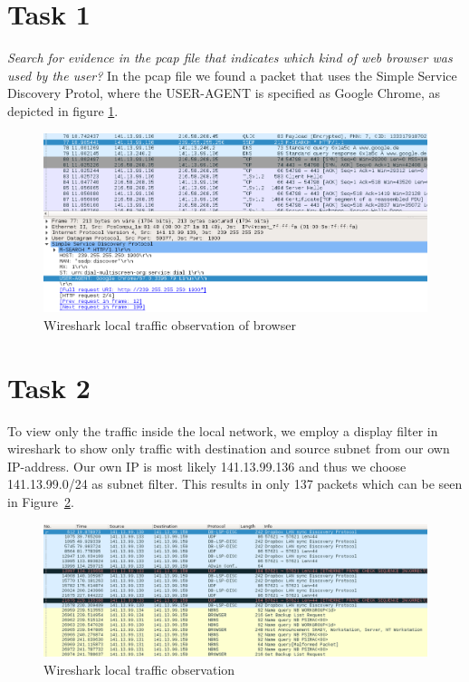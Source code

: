 \documentclass[12pt]{article}
\begin{document}
\maketitle


\section{Task 1}\label{task1}
\emph{Search for evidence in the pcap file that indicates which kind of web browser was
used by the user?}
In the pcap file we found a packet that uses the Simple Service Discovery Protol, where the USER-AGENT is specified as Google Chrome, as depicted in figure \ref{wireshark_browser}.
\begin{figure}[h]%
\centering%
\includegraphics[width=\textwidth]{images/task_1_evidence_browser.png}%
\caption{Wireshark local traffic observation of browser}%
\label{wireshark_browser}%
\end{figure}%



\section{Task 2}\label{task2}
To view only the traffic inside the local network, we employ a display filter in wireshark to show only traffic with destination and source subnet from our own IP-address. Our own IP is most likely 141.13.99.136 and thus we choose 141.13.99.0/24 as subnet filter. This results in only 137 packets which can be seen in Figure~\ref{img_wireshark_overview}.

\begin{figure}[h]%
\centering%
\includegraphics[width=\textwidth]{images/wireshark_overview.png}%
\caption{Wireshark local traffic observation}%
\label{img_wireshark_overview}%
\end{figure}%
\end{document}
